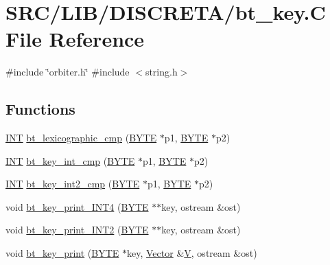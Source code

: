 \hypertarget{bt__key_8_c}{}\section{S\+R\+C/\+L\+I\+B/\+D\+I\+S\+C\+R\+E\+T\+A/bt\+\_\+key.C File Reference}
\label{bt__key_8_c}
{\ttfamily \#include \char`\"{}orbiter.\+h\char`\"{}}\newline
{\ttfamily \#include $<$string.\+h$>$}\newline
\subsection*{Functions}
\begin{DoxyCompactItemize}
\item 
\mbox{\hyperlink{galois_8h_a09fddde158a3a20bd2dcadb609de11dc}{I\+NT}} \mbox{\hyperlink{bt__key_8_c_aa38ef29eaa9e954ba1bebfacae357292}{bt\+\_\+lexicographic\+\_\+cmp}} (\mbox{\hyperlink{galois_8h_ab6cc7b4aeb6ea31aba2b3fbfc83ff5e6}{B\+Y\+TE}} $\ast$p1, \mbox{\hyperlink{galois_8h_ab6cc7b4aeb6ea31aba2b3fbfc83ff5e6}{B\+Y\+TE}} $\ast$p2)
\item 
\mbox{\hyperlink{galois_8h_a09fddde158a3a20bd2dcadb609de11dc}{I\+NT}} \mbox{\hyperlink{bt__key_8_c_a7d03b4040fd1fb79bc15af9e907c975f}{bt\+\_\+key\+\_\+int\+\_\+cmp}} (\mbox{\hyperlink{galois_8h_ab6cc7b4aeb6ea31aba2b3fbfc83ff5e6}{B\+Y\+TE}} $\ast$p1, \mbox{\hyperlink{galois_8h_ab6cc7b4aeb6ea31aba2b3fbfc83ff5e6}{B\+Y\+TE}} $\ast$p2)
\item 
\mbox{\hyperlink{galois_8h_a09fddde158a3a20bd2dcadb609de11dc}{I\+NT}} \mbox{\hyperlink{bt__key_8_c_adb4aba47b9f77ae05a9312c9c3cad58e}{bt\+\_\+key\+\_\+int2\+\_\+cmp}} (\mbox{\hyperlink{galois_8h_ab6cc7b4aeb6ea31aba2b3fbfc83ff5e6}{B\+Y\+TE}} $\ast$p1, \mbox{\hyperlink{galois_8h_ab6cc7b4aeb6ea31aba2b3fbfc83ff5e6}{B\+Y\+TE}} $\ast$p2)
\item 
void \mbox{\hyperlink{bt__key_8_c_ad752d162f10144228c321f41fb5b8bdd}{bt\+\_\+key\+\_\+print\+\_\+\+I\+N\+T4}} (\mbox{\hyperlink{galois_8h_ab6cc7b4aeb6ea31aba2b3fbfc83ff5e6}{B\+Y\+TE}} $\ast$$\ast$key, ostream \&ost)
\item 
void \mbox{\hyperlink{bt__key_8_c_a557e01620ef554044797f4e097ba0924}{bt\+\_\+key\+\_\+print\+\_\+\+I\+N\+T2}} (\mbox{\hyperlink{galois_8h_ab6cc7b4aeb6ea31aba2b3fbfc83ff5e6}{B\+Y\+TE}} $\ast$$\ast$key, ostream \&ost)
\item 
void \mbox{\hyperlink{bt__key_8_c_a14b2a3662044cca4e54d45f271c947aa}{bt\+\_\+key\+\_\+print}} (\mbox{\hyperlink{galois_8h_ab6cc7b4aeb6ea31aba2b3fbfc83ff5e6}{B\+Y\+TE}} $\ast$key, \mbox{\hyperlink{class_vector}{Vector}} \&\mbox{\hyperlink{srg_8_c_af40a326b23c68a27cebe60f16634a2cb}{V}}, ostream \&ost)

\end{DoxyCompactItemize}
